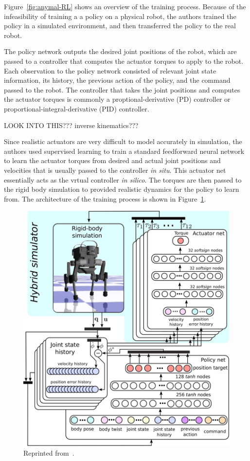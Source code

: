 \documentclass[12pt]{report}
\theoremstyle{definition}
\theoremstyle{remark}
\begin{document}
Figure~\ref{fig:anymal-RL} shows an overview of the training process. Because of the infeasibility of training a a policy on a physical robot, the authors trained the policy in a simulated environment, and then transferred the policy to the real robot.

The policy network outputs the desired joint positions of the robot, which are passed to a controller that computes the actuator torques to apply to the robot. Each observation to the policy network consisted of relevant joint state information, its history, the previous action of the policy, and the command passed to the robot. The controller that takes the joint positions and computes the actuator torques is commonly a proptional-derivative (PD) controller or proportional-integral-derivative (PID) controller.

LOOK INTO THIS??? inverse kinematics???

Since realistic actuators are very difficult to model accurately in simulation, the authors used supervised learning to train a standard feedforward neural network to learn the actuator torques from desired and actual joint positions and velocities that is usually passed to the controller \textit{in situ}. This actuator net essentially acts as the vrtual controller \textit{in silico}. The torques are then passed to the rigid body simulation to provided realistic dynamics for the policy to learn from. The architecture of the training process is shown in Figure~\ref{fig:anymal-detailed}.

\begin{figure}[h]
    \centering
    \includegraphics[width=\linewidth]{figs/anymal_detailed.png}
    \caption{Reprinted from~\cite{hwangbo_learning_2019}.}
    \label{fig:anymal-detailed}
\end{figure}
\end{document}

